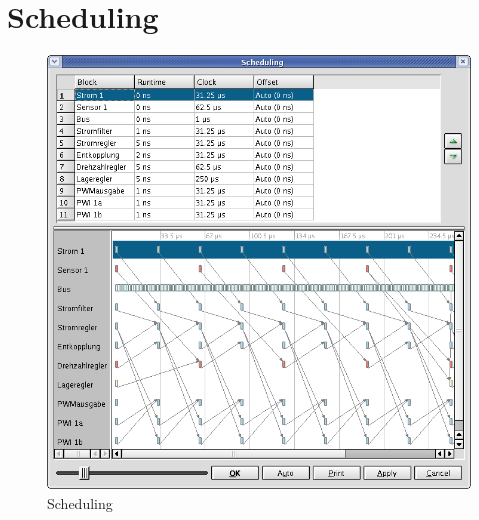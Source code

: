 \documentclass[a4paper,titlepage,12pt,ngerman]{scrbook}
\begin{document}
\newpage
\section{Scheduling}
\begin{figure}[htbp]

\begin{center}

\includegraphics[width=15cm]{Scheduling1}

\caption{Scheduling}\label{test}

\end{center}
\end{figure}
\end{document}
